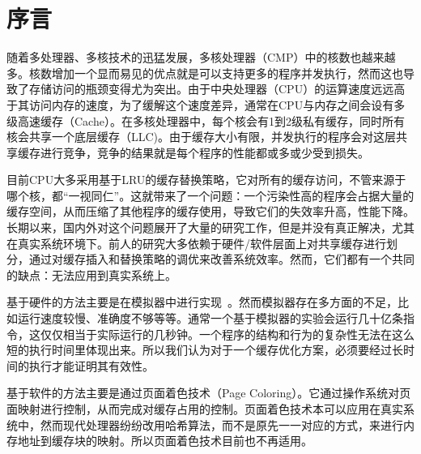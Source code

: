 
\chapter{序言} \label{chap:introduction}
随着多处理器、多核技术的迅猛发展，多核处理器（CMP）中的核数也越来越多。核数增加一个显而易见的优点就是可以支持更多的程序并发执行，然而这也导致了存储访问的瓶颈变得尤为突出。由于中央处理器（CPU）的运算速度远远高于其访问内存的速度，为了缓解这个速度差异，通常在CPU与内存之间会设有多级高速缓存（Cache）。在多核处理器中，每个核会有1到2级私有缓存，同时所有核会共享一个底层缓存（LLC)。由于缓存大小有限，并发执行的程序会对这层共享缓存进行竞争，竞争的结果就是每个程序的性能都或多或少受到损失。

目前CPU大多采用基于LRU的缓存替换策略，它对所有的缓存访问，不管来源于哪个核，都“一视同仁”。这就带来了一个问题：一个污染性高的程序会占据大量的缓存空间，从而压缩了其他程序的缓存使用，导致它们的失效率升高，性能下降。长期以来，国内外对这个问题展开了大量的研究工作，但是并没有真正解决，尤其在真实系统环境下。前人的研究大多依赖于硬件/软件层面上对共享缓存进行划分，通过对缓存插入和替换策略的调优来改善系统效率。然而，它们都有一个共同的缺点：无法应用到真实系统上。

基于硬件的方法主要是在模拟器中进行实现~\parencite{suh2004dynamic,qureshi2006utility,qureshi2007adaptive,hsu2006communist,iyer2004cqos,kim2004fair,rafique2006architectural,xie2009pipp}。然而模拟器存在多方面的不足，比如运行速度较慢、准确度不够等等。通常一个基于模拟器的实验会运行几十亿条指令，这仅仅相当于实际运行的几秒钟。一个程序的结构和行为的复杂性无法在这么短的执行时间里体现出来。所以我们认为对于一个缓存优化方案，必须要经过长时间的执行才能证明其有效性。

基于软件的方法主要是通过页面着色技术（Page Coloring）。它通过操作系统对页面映射进行控制，从而完成对缓存占用的控制。页面着色技术本可以应用在真实系统中，然而现代处理器纷纷改用哈希算法，而不是原先一一对应的方式，来进行内存地址到缓存块的映射。所以页面着色技术目前也不再适用。

